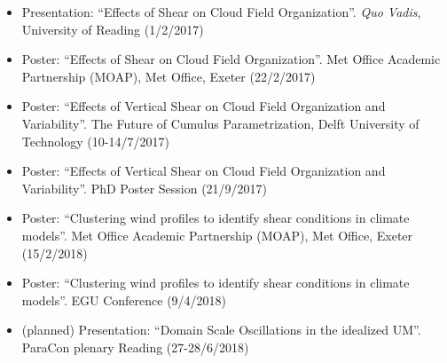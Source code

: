 \documentclass[11pt,a4paper]{article}
\begin{document}
\begin{itemize}
  \item Presentation: ``Effects of Shear on Cloud Field Organization''. \textit{Quo Vadis}, University of Reading (1/2/2017)
  \item Poster: ``Effects of Shear on Cloud Field Organization''. Met Office Academic Partnership (MOAP), Met Office, Exeter (22/2/2017)
  \item Poster: ``Effects of Vertical Shear on Cloud Field Organization and Variability''. The Future of Cumulus Parametrization, Delft University of Technology (10-14/7/2017)
  \item Poster: ``Effects of Vertical Shear on Cloud Field Organization and Variability''. PhD Poster Session (21/9/2017)
  \item Poster: ``Clustering wind profiles to identify shear conditions in climate models''. Met Office Academic Partnership (MOAP), Met Office, Exeter (15/2/2018)
  \item Poster: ``Clustering wind profiles to identify shear conditions in climate models''. EGU Conference (9/4/2018)
  \item (planned) Presentation: ``Domain Scale Oscillations in the idealized UM''. ParaCon plenary Reading (27-28/6/2018)
\end{itemize}
\end{document}
